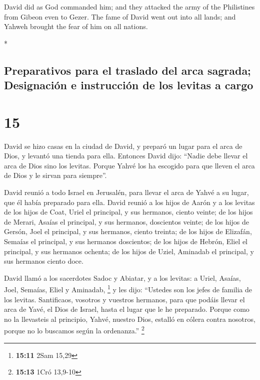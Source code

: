 \begin{paracol}{2}
\begin{otherlanguage}{english}
 David did as God commanded him; and they attacked the
army of the Philistines from Gibeon even to Gezer.  The
fame of David went out into all lands; and Yahweh brought the fear of
him on all nations.

\end{otherlanguage}

\switchcolumn[0]*

\hypertarget{preparativos-para-el-traslado-del-arca-sagrada-designaciuxf3n-e-instrucciuxf3n-de-los-levitas-a-cargo}{%
\subsection{Preparativos para el traslado del arca sagrada; Designación
e instrucción de los levitas a
cargo}\label{preparativos-para-el-traslado-del-arca-sagrada-designaciuxf3n-e-instrucciuxf3n-de-los-levitas-a-cargo}}

\hypertarget{section-28}{%
\section{15}\label{section-28}}

 David se hizo casas en la ciudad de David, y preparó un
lugar para el arca de Dios, y levantó una tienda para ella.
 Entonces David dijo: ``Nadie debe llevar el arca de Dios
sino los levitas. Porque Yahvé los ha escogido para que lleven el arca
de Dios y le sirvan para siempre''.

 David reunió a todo Israel en Jerusalén, para llevar el
arca de Yahvé a su lugar, que él había preparado para ella.
 David reunió a los hijos de Aarón y a los levitas
 de los hijos de Coat, Uriel el principal, y sus hermanos,
ciento veinte;  de los hijos de Merari, Asaías el
principal, y sus hermanos, doscientos veinte;  de los
hijos de Gersón, Joel el principal, y sus hermanos, ciento treinta;
 de los hijos de Elizafán, Semaías el principal, y sus
hermanos doscientos;  de los hijos de Hebrón, Eliel el
principal, y sus hermanos ochenta;  de los hijos de
Uziel, Aminadab el principal, y sus hermanos ciento doce.

 David llamó a los sacerdotes Sadoc y Abiatar, y a los
levitas: a Uriel, Asaías, Joel, Semaías, Eliel y Aminadab, \footnote{\textbf{15:11}
  2Sam 15,29}  y les dijo: ``Ustedes son los jefes de
familia de los levitas. Santificaos, vosotros y vuestros hermanos, para
que podáis llevar el arca de Yavé, el Dios de Israel, hasta el lugar que
le he preparado.  Porque como no la llevasteis al
principio, Yahvé, nuestro Dios, estalló en cólera contra nosotros,
porque no lo buscamos según la ordenanza.'' \footnote{\textbf{15:13}
  1Cró 13,9-10}


\end{paracol}
